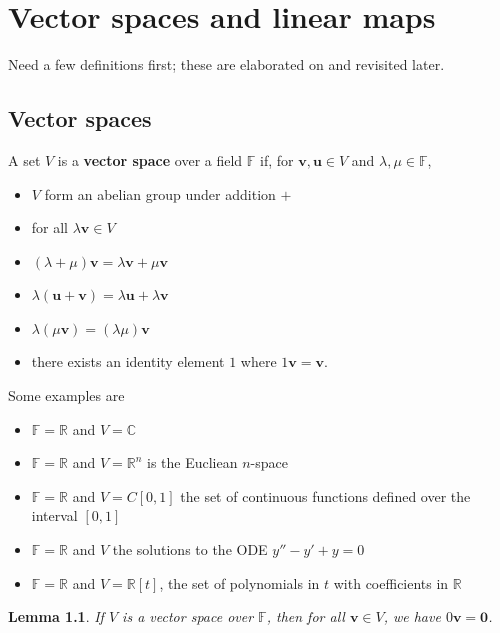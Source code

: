 \documentclass[letter-paper]{tufte-book}
\newtheorem{lemma}[theorem]{\color{pastel-blue}Lemma}
\newcommand{\Ob}{{\boldsymbol{0}}}
\newcommand{\ub}{{\boldsymbol{u}}}
\newcommand{\vb}{{\boldsymbol{v}}}
\begin{document}

\chapter{Vector spaces and linear maps}

Need a few definitions first; these are elaborated on and revisited later.


\section{Vector spaces}

A set $V$ is a \textbf{vector space} over a field $\mathbb{F}$ if, for $\vb, \ub \in V$ and $\lambda, \mu \in \mathbb{F}$,
\begin{itemize}
  \item $V$ form an abelian group under addition $+$
  \item for all $\lambda\vb \in V$
  \item $(\lambda + \mu)\vb = \lambda \vb + \mu \vb$
  \item $\lambda(\ub + \vb) = \lambda \ub + \lambda \vb$
  \item $\lambda (\mu \vb) = (\lambda \mu) \vb$
  \item there exists an identity element $1$ where $1\vb = \vb$.
\end{itemize}

Some examples are
\begin{itemize}
  \item $\mathbb{F} = \mathbb{R}$ and $V = \mathbb{C}$
  \item $\mathbb{F} = \mathbb{R}$ and $V = \mathbb{R}^n$ is the Eucliean $n$-space
  \item $\mathbb{F} = \mathbb{R}$ and $V = C[0, 1]$ the set of continuous functions defined over the interval $[0, 1]$
  \item $\mathbb{F} = \mathbb{R}$ and $V$ the solutions to the ODE $y'' - y' + y
  = 0$
  \item $\mathbb{F} = \mathbb{R}$ and $V = \mathbb{R}[t]$, the set of polynomials in $t$ with coefficients in $\mathbb{R}$
\end{itemize}

\begin{lemma}
  If $V$ is a vector space over $\mathbb{F}$, then for all $\vb \in V$, we have $0\vb = \Ob$.
\end{lemma}
\end{document}
